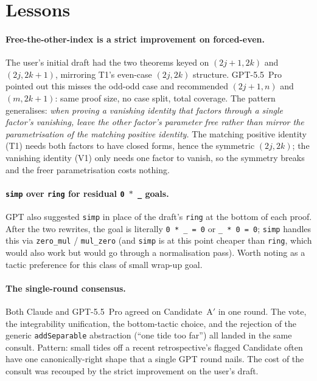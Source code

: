 \documentclass[11pt]{article}
\begin{document}
\section{Lessons}

\paragraph{Free-the-other-index is a strict improvement on
forced-even.} The user's initial draft had the two theorems keyed on
$(2j+1, 2k)$ and $(2j, 2k+1)$, mirroring T1's even-case
$(2j, 2k)$ structure. GPT-5.5~Pro pointed out this misses the
odd-odd case and recommended $(2j+1, n)$ and $(m, 2k+1)$: same proof
size, no case split, total coverage. The pattern generalises:
\emph{when proving a vanishing identity that factors through a single
factor's vanishing, leave the other factor's parameter free rather
than mirror the parametrisation of the matching positive identity.}
The matching positive identity (T1) needs both factors to have
closed forms, hence the symmetric $(2j, 2k)$; the vanishing identity
(V1) only needs one factor to vanish, so the symmetry breaks and the
freer parametrisation costs nothing.

\paragraph{\texttt{simp} over \texttt{ring} for residual
\texttt{0 \(*\) \_} goals.} GPT also suggested \texttt{simp} in
place of the draft's \texttt{ring} at the bottom of each proof.
After the two rewrites, the goal is literally \texttt{0 * \_ = 0}
or \texttt{\_ * 0 = 0}; \texttt{simp} handles this via
\texttt{zero\_mul} / \texttt{mul\_zero} (and \texttt{simp} is at this
point cheaper than \texttt{ring}, which would also work but would
go through a normalisation pass). Worth noting as a tactic
preference for this class of small wrap-up goal.

\paragraph{The single-round consensus.} Both Claude and GPT-5.5~Pro
agreed on Candidate~A$'$ in one round. The vote, the integrability
unification, the bottom-tactic choice, and the rejection of the
generic \texttt{addSeparable} abstraction (``one tide too far'')
all landed in the same consult. Pattern: small tides off a recent
retrospective's flagged Candidate often have one canonically-right
shape that a single GPT round nails. The cost of the consult was
recouped by the strict improvement on the user's draft.
\end{document}

